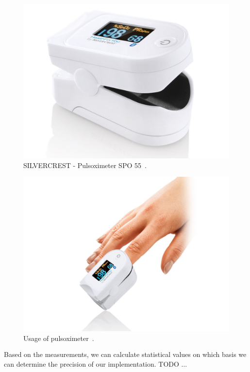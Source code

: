 \documentclass[11pt,a4paper]{article}
\begin{document}
\newpage

\begin{figure}[H]
    \centering
    \includegraphics[scale=0.15]{img/pulsoximeter1.jpg}
    \caption{SILVERCREST - Pulsoximeter SPO 55~\cite{IMG-PULSOXIMETER-1}.}
    \label{fig:pulsoximeter1}
\end{figure}

\begin{figure}[H]
    \centering
    \includegraphics[scale=0.7]{img/pulsoximeter2.jpg}
    \caption{Usage of pulsoximeter~\cite{IMG-PULSOXIMETER-2}.}
    \label{fig:pulsoximeter2}
\end{figure}

Based on the measurements, we can calculate statistical values on which basis we can determine the precision of our implementation. TODO ...\\
\end{document}
